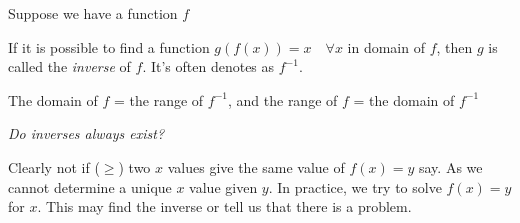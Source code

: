 \documentclass[10pt]{scrartcl}
\begin{document}
 

Suppose we have a function $f$

\begin{center}
\end{center}


\begin{definition}
If it is possible to find a function $g(f(x)) = x \quad \forall x$ in domain of $f$, then $g$ is called the \emph{inverse} of $f$. It's often denotes as $f^{-1}$.
\end{definition}

The domain of $f$ = the range of $f^{-1}$, and the range of $f$ = the domain of $f^{-1}$

\textit{Do inverses always exist?} 

Clearly not if ($\geq$) two $x$ values give the same value of $f(x) = y$ say. As we cannot determine a unique $x$ value given $y$. In practice, we try to solve $f(x) = y$ for $x$. This may find the inverse or tell us that there is a problem.\\
\end{document}
